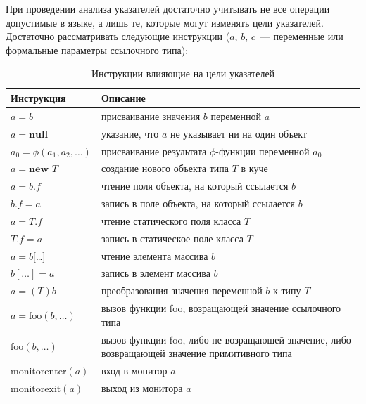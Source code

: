 \documentclass[14pt,titlepage]{extarticle}
\newcommand{\NEW}{\textbf{new }}
\newcommand{\NULL}{\textbf{null }}
\begin{document}
      При проведении анализа указателей достаточно учитывать не все операции
      допустимые в языке, а лишь те, которые могут изменять цели указателей.
      Достаточно рассматривать следующие инструкции ($a$, $b$, $c$~---
      переменные или формальные параметры ссылочного типа):
      \begin{table}
        \begin{tabular}{|l|p{120mm}|}\hline
          \textbf{Инструкция} & \textbf{Описание}\\ \hline

          $a = b$
          & присваивание значения $b$ переменной $a$ \\ \hline

          $a = \NULL$
          & указание, что $a$ не указывает ни на один объект \\ \hline

          $a_0 = \phi(a_1, a_2, \ldots)$
          & присваивание результата $\phi$-функции переменной $a_0$ \\ \hline

          $a = \NEW T$
          & создание нового объекта типа $T$ в куче \\ \hline

          $a = b.f$
          & чтение поля объекта, на который ссылается $b$ \\ \hline

          $b.f = a$
          & запись в поле объекта, на который ссылается $b$ \\ \hline

          $a = T.f$
          & чтение статического поля класса $T$ \\ \hline

          $T.f = a$
          & запись в статическое поле класса $T$ \\ \hline

          $a = b$[\ldots]
          & чтение элемента массива $b$ \\ \hline

          $b[\ldots] = a$
          & запись в элемент массива $b$ \\ \hline

          $a = (T)b$
          & преобразования значения переменной $b$ к типу $T$ \\ \hline

          $a = \textrm{foo}(b, \ldots)$
          & вызов функции foo, возращающей значение ссылочного типа \\ \hline

          $\textrm{foo}(b, \ldots)$
          & вызов функции foo, либо не возращающей значение, либо возвращающей значение примитивного типа \\ \hline

          $\textrm{monitorenter}(a)$
          & вход в монитор $a$ \\ \hline

          $\textrm{monitorexit}(a)$
          & выход из монитора $a$ \\ \hline
        \end{tabular}
        \caption{Инструкции влияющие на цели указателей}
        \label{tabular:instructions}
      \end{table}
\end{document}
